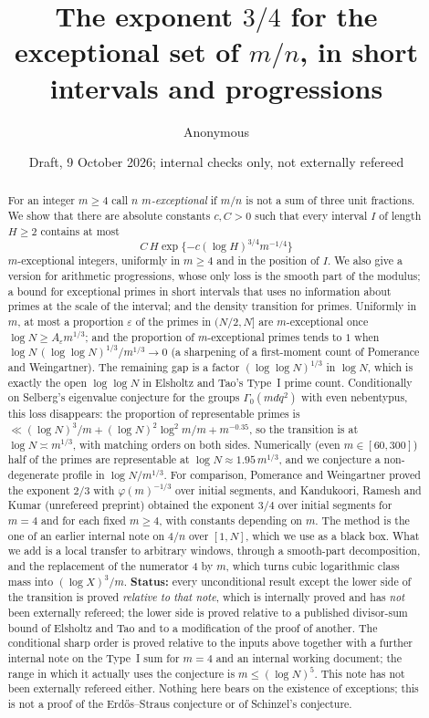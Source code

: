 \documentclass[10pt,reqno]{amsart}
\title[The exponent $3/4$ for $m/n$ in short intervals]{The exponent $3/4$ for the exceptional set of $m/n$, in short intervals and progressions}
\author{Anonymous}
\date{Draft, 9 October 2026; internal checks only, not externally refereed}
\theoremstyle{definition}
\begin{document}
\begin{abstract}
For an integer $m\geq4$ call $n$ \emph{$m$-exceptional} if $m/n$ is not a
sum of three unit fractions.  We show that there are absolute constants
$c,C>0$ such that every interval $I$ of length $H\geq2$ contains at most
\[
 C\,H\exp\{-c(\log H)^{3/4}m^{-1/4}\}
\]
$m$-exceptional integers, uniformly in $m\geq4$ and in the position of
$I$.  We also give a version for arithmetic progressions, whose only loss
is the smooth part of the modulus; a bound for exceptional primes in short
intervals that uses no information about primes at the scale of the
interval; and the density transition for primes.  Uniformly in $m$,
at most a proportion $\varepsilon$ of the primes in $(N/2,N]$ are
$m$-exceptional once $\log N\geq A_\varepsilon m^{1/3}$; and the
proportion of $m$-exceptional primes tends to $1$ when
$\log N\,(\log\log N)^{1/3}/m^{1/3}\to0$ (a sharpening of a first-moment count of Pomerance and Weingartner).
The remaining gap is a factor $(\log\log N)^{1/3}$ in $\log N$, which is
exactly the open $\log\log N$ in Elsholtz and Tao's Type~I prime count.
Conditionally on Selberg's eigenvalue conjecture for the groups
$\Gamma_0(mdq^2)$ with even nebentypus, this loss disappears: the proportion
of representable primes is $\ll(\log N)^3/m+(\log N)^2\log^2m/m+m^{-0.35}$,
so the transition is at $\log N\asymp m^{1/3}$, with matching orders on both sides.
Numerically (even $m\in[60,300]$) %
half of the primes are representable at
$\log N\approx1.95\,m^{1/3}$, and we conjecture a non-degenerate profile
in $\log N/m^{1/3}$.  For comparison, Pomerance and Weingartner proved the
exponent $2/3$ with $\varphi(m)^{-1/3}$ over initial segments, and
Kandukoori, Ramesh and Kumar (unrefereed preprint) obtained the exponent
$3/4$ over initial segments for $m=4$ and for each fixed $m\geq4$, with
constants depending on $m$.
The method is the one of an earlier internal note on $4/n$ over
$[1,N]$, which we use as a black box.  What we add is a local transfer
to arbitrary windows, through a smooth-part decomposition, and the
replacement of the numerator $4$ by $m$, which turns cubic logarithmic
class mass into $(\log X)^3/m$.  \textbf{Status:} every unconditional result except the
lower side of the transition is proved \emph{relative to that note},
which is internally proved and has \emph{not} been externally refereed;
the lower side is proved relative to a published divisor-sum bound of
Elsholtz and Tao and to a modification of the proof of another.  %
The conditional sharp order is proved relative to the inputs above together with a further internal %
note on the Type~I sum for $m=4$ and an internal working document; the
range in which it actually uses the conjecture is $m\leq(\log N)^5$.
This note has not been externally refereed either.
Nothing here bears on the existence of exceptions; this is not a proof of
the Erd\H{o}s--Straus conjecture or of Schinzel's conjecture.
\end{abstract}
\maketitle
\end{document}
